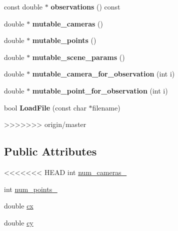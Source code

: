\begin{DoxyCompactItemize}
\begin{DoxyCompactItemize}
\item 
\hypertarget{classbaProblem__ref_a80cd1a4c54c8dd32cc183da7c94d1e56}{const double $\ast$ {\bfseries observations} () const }\label{d2/d3f/classbaProblem__ref_a80cd1a4c54c8dd32cc183da7c94d1e56}

\item 
\hypertarget{classbaProblem__ref_a90468afc78c2e244364fe218a53392af}{double $\ast$ {\bfseries mutable\-\_\-cameras} ()}\label{d2/d3f/classbaProblem__ref_a90468afc78c2e244364fe218a53392af}

\item 
\hypertarget{classbaProblem__ref_a926b72fd733cd727a98faf38748b0c73}{double $\ast$ {\bfseries mutable\-\_\-points} ()}\label{d2/d3f/classbaProblem__ref_a926b72fd733cd727a98faf38748b0c73}

\item 
\hypertarget{classbaProblem__ref_a63109b77ebee946d9c278a6124447221}{double $\ast$ {\bfseries mutable\-\_\-scene\-\_\-params} ()}\label{d2/d3f/classbaProblem__ref_a63109b77ebee946d9c278a6124447221}

\item 
\hypertarget{classbaProblem__ref_ad8a8ec7cd0449706b6472dbb2637d86a}{double $\ast$ {\bfseries mutable\-\_\-camera\-\_\-for\-\_\-observation} (int i)}\label{d2/d3f/classbaProblem__ref_ad8a8ec7cd0449706b6472dbb2637d86a}

\item 
\hypertarget{classbaProblem__ref_afabc124e4d51af38b22cd82ba456c524}{double $\ast$ {\bfseries mutable\-\_\-point\-\_\-for\-\_\-observation} (int i)}\label{d2/d3f/classbaProblem__ref_afabc124e4d51af38b22cd82ba456c524}

\item 
\hypertarget{classbaProblem__ref_ad8d56df86b80e06a25ea4759b7a46196}{bool {\bfseries Load\-File} (const char $\ast$filename)}\label{d2/d3f/classbaProblem__ref_ad8d56df86b80e06a25ea4759b7a46196}

>>>>>>> origin/master
\end{DoxyCompactItemize}
\subsection*{Public Attributes}
\begin{DoxyCompactItemize}
\item 
<<<<<<< HEAD
int \hyperlink{classbaProblem__ref_aa66f29e12cd960cab710165a755f0b35}{num\-\_\-cameras\-\_\-}
\item 
int \hyperlink{classbaProblem__ref_a970268458224931ac624358248d1a7cc}{num\-\_\-points\-\_\-}
\item 
double \hyperlink{classbaProblem__ref_a7f8a2c3626cbd11ac8aba36d8fb24558}{cx}
\item 
double \hyperlink{classbaProblem__ref_a6dd08234b8f251edf79d66d2f800a905}{cy}
\end{DoxyCompactItemize}



\end{DoxyCompactItemize}
